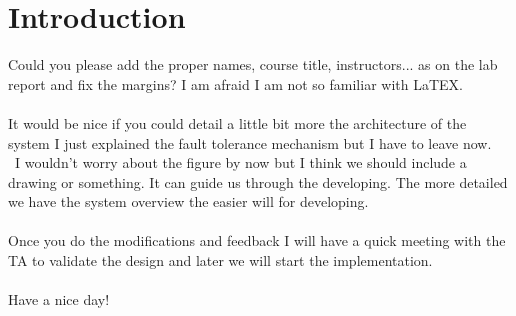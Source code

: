 \section{Introduction}
Could you please add the proper names, course title, instructors... as on the lab report and fix the margins? I am afraid I am not so familiar with LaTEX.
\\\\
It would be nice if you could detail a little bit more the architecture of the system I just explained the fault tolerance mechanism but I have to leave now.
\\\
I wouldn't worry about the figure by now but I think we should include a drawing or something. It can guide us through the developing. The more detailed we have the system overview the easier will for developing.
\\\\ 
Once you do the modifications and feedback I will have a quick meeting with the TA to validate the design and later we will start the implementation.
\\\\
Have a nice day! 
